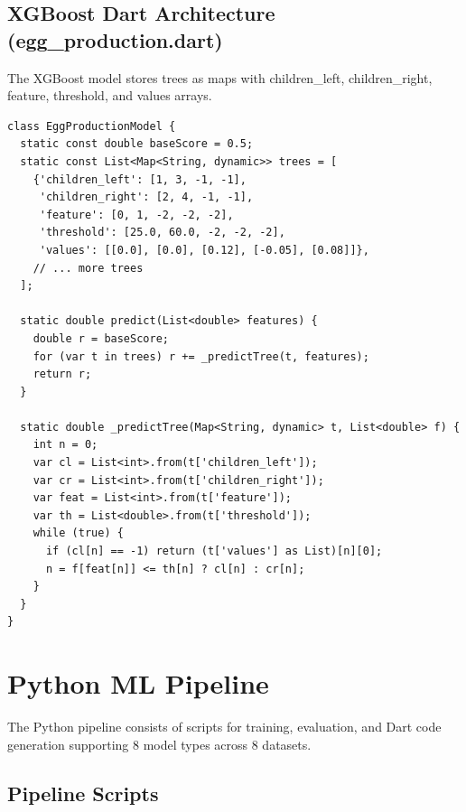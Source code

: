 \documentclass[12pt,a4paper,oneside]{report}
\begin{document}
\section{XGBoost Dart Architecture (egg\_production.dart)}

The XGBoost model stores trees as maps with children\_left, children\_right, feature, threshold, and values arrays.

\begin{lstlisting}[style=dartstyle]
class EggProductionModel {
  static const double baseScore = 0.5;
  static const List<Map<String, dynamic>> trees = [
    {'children_left': [1, 3, -1, -1],
     'children_right': [2, 4, -1, -1],
     'feature': [0, 1, -2, -2, -2],
     'threshold': [25.0, 60.0, -2, -2, -2],
     'values': [[0.0], [0.0], [0.12], [-0.05], [0.08]]},
    // ... more trees
  ];

  static double predict(List<double> features) {
    double r = baseScore;
    for (var t in trees) r += _predictTree(t, features);
    return r;
  }

  static double _predictTree(Map<String, dynamic> t, List<double> f) {
    int n = 0;
    var cl = List<int>.from(t['children_left']);
    var cr = List<int>.from(t['children_right']);
    var feat = List<int>.from(t['feature']);
    var th = List<double>.from(t['threshold']);
    while (true) {
      if (cl[n] == -1) return (t['values'] as List)[n][0];
      n = f[feat[n]] <= th[n] ? cl[n] : cr[n];
    }
  }
}
\end{lstlisting}

\chapter{Python ML Pipeline}
\label{ch:ml_pipeline}

The Python pipeline consists of scripts for training, evaluation, and Dart code generation supporting 8 model types across 8 datasets.

\section{Pipeline Scripts}
\end{document}
